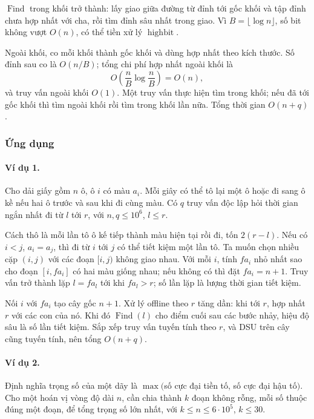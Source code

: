 \documentclass[11pt]{article}
\begin{document}
\(\operatorname{Find}\) trong khối trở thành: lấy giao giữa đường từ đỉnh tới
gốc khối và tập đỉnh chưa hợp nhất với cha, rồi tìm đỉnh sâu nhất trong giao.
Vì \(B=\lfloor\log n\rfloor\), số bit không vượt \(O(n)\), có thể tiền xử lý
\(\operatorname{highbit}\).

Ngoài khối, co mỗi khối thành gốc khối và dùng hợp nhất theo kích thước. Số
đỉnh sau co là \(O(n/B)\); tổng chi phí hợp nhất ngoài khối là
\[
  O\left(\frac nB\log\frac nB\right)=O(n),
\]
và truy vấn ngoài khối \(O(1)\). Một truy vấn thực hiện tìm trong khối; nếu đã
tới gốc khối thì tìm ngoài khối rồi tìm trong khối lần nữa. Tổng thời gian
\(O(n+q)\).

\subsubsection{Ứng dụng}

\paragraph{Ví dụ 1.}
Cho dải giấy gồm \(n\) ô, ô \(i\) có màu \(a_i\). Mỗi giây có thể tô lại một ô
hoặc đi sang ô kề nếu hai ô trước và sau khi đi cùng màu. Có \(q\) truy vấn độc
lập hỏi thời gian ngắn nhất đi từ \(l\) tới \(r\), với \(n,q\le 10^6\),
\(l\le r\).

Cách thô là mỗi lần tô ô kế tiếp thành màu hiện tại rồi đi, tốn \(2(r-l)\).
Nếu có \(i<j\), \(a_i=a_j\), thì đi từ \(i\) tới \(j\) có thể tiết kiệm một lần
tô. Ta muốn chọn nhiều cặp \((i,j)\) với các đoạn \([i,j)\) không giao nhau.
Với mỗi \(i\), tính \(fa_i\) nhỏ nhất sao cho đoạn \([i,fa_i]\) có hai màu
giống nhau; nếu không có thì đặt \(fa_i=n+1\). Truy vấn trở thành lặp
\(l=fa_l\) tới khi \(fa_l>r\); số lần lặp là lượng thời gian tiết kiệm.

Nối \(i\) với \(fa_i\) tạo cây gốc \(n+1\). Xử lý offline theo \(r\) tăng dần:
khi tới \(r\), hợp nhất \(r\) với các con của nó. Khi đó \(\operatorname{Find}(l)\)
cho điểm cuối sau các bước nhảy, hiệu độ sâu là số lần tiết kiệm. Sắp xếp truy
vấn tuyến tính theo \(r\), và DSU trên cây cũng tuyến tính, nên tổng \(O(n+q)\).

\paragraph{Ví dụ 2.}
Định nghĩa trọng số của một dãy là
\(\max(\)số cực đại tiền tố, số cực đại hậu tố\()\). Cho một hoán vị vòng độ
dài \(n\), cần chia thành \(k\) đoạn không rỗng, mỗi số thuộc đúng một đoạn, để
tổng trọng số lớn nhất, với \(k\le n\le 6\cdot 10^5\), \(k\le 30\).
\end{document}
